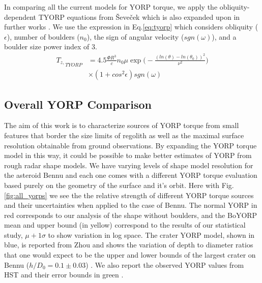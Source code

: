 In comparing all the current models for YORP torque, we apply the obliquity-dependent TYORP equations from Ševeček which is also expanded upon in further works \cite{Sevecek2016} \cite{Golubov2019}. We use the expression in Eq.\ref{eq:tyorp} which considers obliquity ($\epsilon$), number of boulders ($n_0$), the sign of angular velocity ($sgn(\omega)$), and a boulder size power index of 3. 
\begin{equation}\label{eq:tyorp}
    \begin{split}
    {T_{z,}}_{TYORP} & = 4.5 \frac{\Phi R^3}{c}n_0 \mu \exp \Bigg( -\frac{(ln(\theta)-ln(\theta_0))^2}{\nu^2}\Bigg)\\
    & \times (1+cos^2\epsilon)sgn(\omega)
    \end{split}
\end{equation}

\subsection{Overall YORP Comparison}


The aim of this work is to characterize sources of YORP torque from small features that border the size limits of regolith as well as the maximal surface resolution obtainable from ground observations. By expanding the YORP torque model in this way, it could be possible to make better estimates of YORP from rough radar shape models. We have varying levels of shape model resolution for the asteroid Bennu and each one comes with a different YORP torque evaluation based purely on the geometry of the surface and it's orbit. Here with Fig. \ref{fig:all_yorps} we see the the relative strength of different YORP torque sources and their uncertainties when applied to the case of Bennu. The normal YORP in red corresponds to our analysis of the shape without boulders, and the BoYORP mean and upper bound (in yellow) correspond to the results of our statistical study, $\mu+1\sigma$ to show variation in log space. The crater YORP model, shown in blue, is reported from Zhou and shows the variation  of depth to diameter ratios that one would expect to be the upper and lower bounds of the largest crater on Bennu ($h/D_0 = 0.1\pm0.03$) \cite{Zhou2022} \cite{Daly2020a}. We also report the observed YORP values from HST and their error bounds in green \cite{Nolan2019}.

